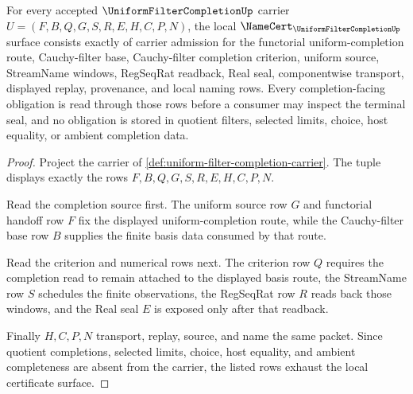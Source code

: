 \begin{theorem}
\label{thm:uniform-filter-completion-namecert-obligations}
For every accepted $\UniformFilterCompletionUp$ carrier $U=(F,B,Q,G,S,R,E,H,C,P,N)$, the local $\NameCert_{\UniformFilterCompletionUp}$ surface consists exactly of carrier admission for the functorial uniform-completion route, Cauchy-filter base, Cauchy-filter completion criterion, uniform source, StreamName windows, RegSeqRat readback, Real seal, componentwise transport, displayed replay, provenance, and local naming rows. Every completion-facing obligation is read through those rows before a consumer may inspect the terminal seal, and no obligation is stored in quotient filters, selected limits, choice, host equality, or ambient completion data.
\end{theorem}
\begin{proof}
Project the carrier of \autoref{def:uniform-filter-completion-carrier}. The tuple displays exactly the rows $F,B,Q,G,S,R,E,H,C,P,N$.

Read the completion source first. The uniform source row $G$ and functorial handoff row $F$ fix the displayed uniform-completion route, while the Cauchy-filter base row $B$ supplies the finite basis data consumed by that route.

Read the criterion and numerical rows next. The criterion row $Q$ requires the completion read to remain attached to the displayed basis route, the StreamName row $S$ schedules the finite observations, the RegSeqRat row $R$ reads back those windows, and the Real seal $E$ is exposed only after that readback.

Finally $H,C,P,N$ transport, replay, source, and name the same packet. Since quotient completions, selected limits, choice, host equality, and ambient completeness are absent from the carrier, the listed rows exhaust the local certificate surface.
\end{proof}

